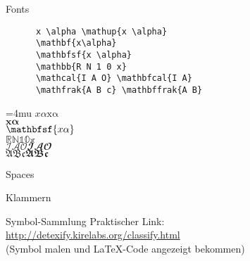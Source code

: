 \begin{frame}[fragile]{Fonts}
  \begin{CodeExample}{0.70}
    \begin{lstlisting}
      x \alpha \mathup{x \alpha}
      \mathbf{x\alpha}
      \mathbfsf{x \alpha}
      \mathbb{R N 1 0 x}
      \mathcal{I A O} \mathbfcal{I A}
      \mathfrak{A B c} \mathbffrak{A B}
    \end{lstlisting}
  \CodeResult
    \Umathordordspacing\textstyle=4mu
    $x \alpha \mathup{x \alpha}$ \\
    $\mathbf{x\alpha}$ \\
    $\mathbfsf{x \alpha}$ \\
    $\mathbb{R N 1 0 x}$ \\
    $\mathcal{I A O} \mathbfcal{I A O}$ \\
    $\mathfrak{A B c} \mathbffrak{A B c}$
  \end{CodeExample}
\end{frame}

\begin{frame}[fragile]{Spaces}
\end{frame}

\begin{frame}[fragile]{Klammern}
\end{frame}

\begin{frame}[fragile]{
  Symbol-Sammlung
  \hfill{}
  \hfill{}
}
  Praktischer Link: \\
  \url{http://detexify.kirelabs.org/classify.html} \\
  (Symbol malen und \LaTeX-Code angezeigt bekommen)
\end{frame}

